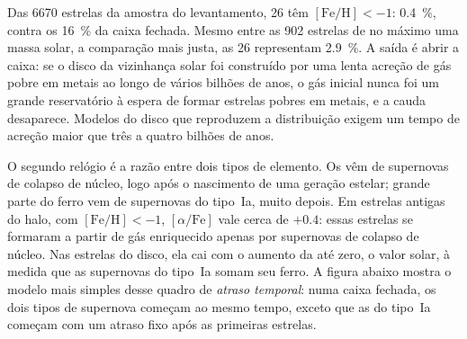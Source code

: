 Das 6670 estrelas da amostra do levantamento, 26 têm $[\mathrm{Fe/H}] < -1$:
\qty{0.4}{\percent}, contra os \qty{16}{\percent} da caixa fechada.
Mesmo entre as 902 estrelas de no máximo uma massa solar, a comparação mais justa,
as 26 representam \qty{2.9}{\percent}. A saída é abrir a
caixa: se o disco da vizinhança solar foi construído por uma lenta acreção
de gás pobre em metais ao longo de vários bilhões de anos, o gás inicial nunca foi
um grande reservatório à espera de formar estrelas pobres em metais, e a cauda
desaparece. Modelos do disco que reproduzem a distribuição exigem um
tempo de acreção maior que três a quatro bilhões de anos.

O segundo relógio é a razão entre dois tipos de elemento. Os 
vêm de supernovas de colapso de núcleo, logo após o nascimento de uma
geração estelar; grande parte do ferro vem de supernovas do tipo~Ia,
muito depois. Em estrelas antigas do halo, com $[\mathrm{Fe/H}] < -1$,
$[\alpha/\mathrm{Fe}]$ vale cerca de $+0.4$: essas estrelas se formaram a partir de gás
enriquecido apenas por supernovas de colapso de núcleo. Nas estrelas do disco, ela cai com
o aumento da  até zero, o valor solar, à medida que as supernovas do tipo~Ia
somam seu ferro. A figura abaixo mostra o modelo mais simples
desse quadro de \emph{atraso temporal}: numa caixa fechada, os dois tipos de
supernova começam ao mesmo tempo, exceto que as do tipo~Ia começam com um atraso fixo
após as primeiras estrelas.

